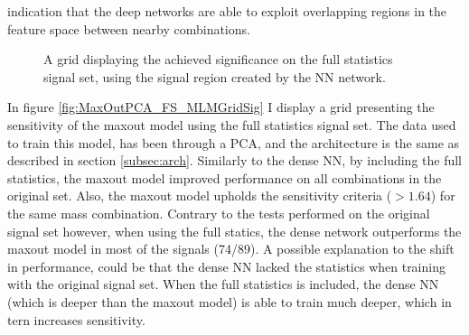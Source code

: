 indication that the deep networks are able to exploit overlapping regions in the feature space between nearby combinations.\\
\begin{figure}
    \caption{A grid displaying the achieved significance on the full statistics signal set, using the signal region 
    created by the \ac{NN} network.}
    \label{fig:NN_FS_MLMGridSig}
\end{figure}
In figure \ref{fig:MaxOutPCA_FS_MLMGridSig} I display a grid presenting the sensitivity of the maxout model using the full statistics 
signal set. The data used to train this model, has been through a \ac{PCA}, and the architecture is the same as described in section \ref{subsec:arch}.
Similarly to the dense \ac{NN}, by including the full statistics, the maxout model improved performance on all combinations in the original set. 
Also, the maxout model upholds the sensitivity criteria ($>1.64$) for the same mass combination. 
Contrary to the tests performed on the original signal set however, when using the full statics, the dense network 
outperforms the maxout model in most of the signals (74/89). A possible explanation to the shift in performance, could 
be that the dense \ac{NN} lacked the statistics when training with the original signal set. When the full statistics is included,
the dense \ac{NN} (which is deeper than the maxout model) is able to train much deeper, which in tern increases sensitivity.
